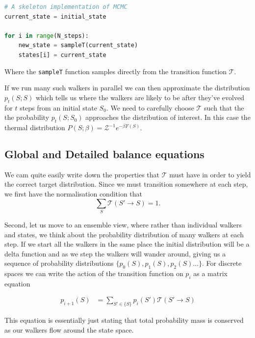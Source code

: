 \begin{lstlisting}[language=Python]
# A skeleton implementation of MCMC
current_state = initial_state

for i in range(N_steps):
    new_state = sampleT(current_state) 
    states[i] = current_state
\end{lstlisting}

Where the \passthrough{\lstinline!sampleT!} function samples directly from the transition function \(\mathcal{T}\).

If we run many such walkers in parallel we can then approximate the distribution \(p_t(S; S)\) which tells us where the walkers are likely to be after they've evolved for \(t\) steps from an initial state \(S_0\). We need to carefully choose \(\mathcal{T}\) such that the the probability \(p_t(S; S_0)\) approaches the distribution of interest. In this case the thermal distribution \(P(S; \beta) = \mathcal{Z}^{-1} e^{-\beta F(S)}\).

\hypertarget{global-and-detailed-balance-equations}{%
\subsection{Global and Detailed balance equations}\label{global-and-detailed-balance-equations}}

We cam quite easily write down the properties that \(\mathcal{T}\) must have in order to yield the correct target distribution. Since we must transition somewhere at each step, we first have the normalisation condition that \[\sum\limits_S \mathcal{T}(S' \rightarrow S) = 1.\]

Second, let us move to an ensemble view, where rather than individual walkers and states, we think about the probability distribution of many walkers at each step. If we start all the walkers in the same place the initial distribution will be a delta function and as we step the walkers will wander around, giving us a sequence of probability distributions \(\{p_0(S), p_1(S), p_2(S)\ldots\}\). For discrete spaces we can write the action of the transition function on \(p_i\) as a matrix equation

\[\begin{aligned}
p_{i+1}(S) &= \sum_{S' \in \{S\}} p_i(S') \mathcal{T}(S' \rightarrow S)
\end{aligned}\]

This equation is essentially just stating that total probability mass is conserved as our walkers flow around the state space.

